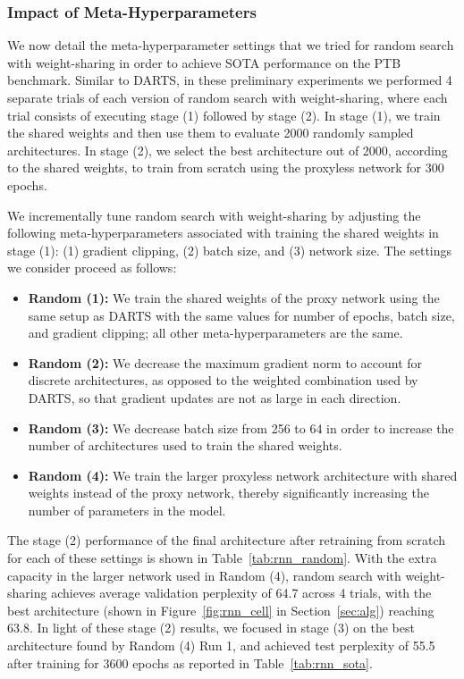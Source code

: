 \documentclass[acmlarge, nonacm]{acmart}
\begin{document}
 \subsubsection{Impact of Meta-Hyperparameters}
 \label{ssec:rnn_random}
We now detail the meta-hyperparameter settings that we tried for random search with weight-sharing in order to achieve SOTA performance on the PTB benchmark. Similar to DARTS, in these preliminary experiments we performed 4 separate trials of each version of random search with weight-sharing, where each trial consists of executing stage (1) followed by stage (2). In stage (1), we train the shared weights and then use them to evaluate 2000 randomly sampled architectures.  In stage (2), we select the best architecture out of 2000, according to the shared weights, to train from scratch using the proxyless network for 300 epochs. 

We incrementally tune random search with weight-sharing by adjusting the following meta-hyperparameters associated with training the shared weights in stage (1): (1) gradient clipping, (2) batch size, and (3) network size.  The settings we consider proceed as follows: 
\begin{itemize}
    \item \textbf{Random (1):} We train the shared weights of the proxy network using the same setup as DARTS with the same values for number of epochs, batch size, and gradient clipping; all other meta-hyperparameters are the same.
    \item \textbf{Random (2):} We decrease the maximum gradient norm to account for discrete architectures, as opposed to the weighted combination used by DARTS, so that gradient updates are not as large in each direction.
    \item \textbf{Random (3):} We decrease batch size from 256 to 64 in order to increase the number of architectures used to train the shared weights. 
    \item \textbf{Random (4):} We train the larger proxyless network architecture with shared weights instead of the proxy network, thereby significantly increasing the number of parameters in the model.   
\end{itemize} 
The stage (2) performance of the final architecture after retraining from scratch for each of these settings is shown in Table~\ref{tab:rnn_random}.
With the extra capacity in the larger network used in Random (4), random search with weight-sharing achieves average validation perplexity of 64.7 across 4 trials, 
with the best architecture (shown in Figure~\ref{fig:rnn_cell} in Section~\ref{sec:alg}) reaching 63.8.  
In light of these stage (2) results, we focused in stage (3) on the best architecture found by Random (4) Run 1, and achieved test perplexity of 55.5 after training for 3600 epochs as reported in Table~\ref{tab:rnn_sota}.
\end{document}
